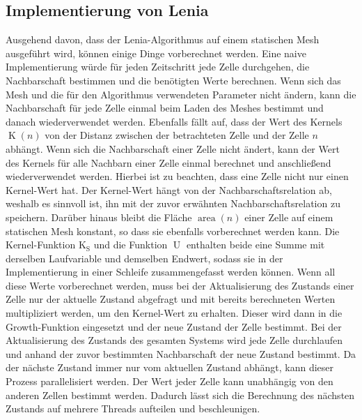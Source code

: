 \subsection{Implementierung von Lenia}
Ausgehend davon, dass der Lenia-Algorithmus auf einem statischen Mesh ausgeführt wird, können einige Dinge vorberechnet werden.
Eine naive Implementierung würde für jeden Zeitschritt jede Zelle durchgehen, die Nachbarschaft bestimmen und die benötigten Werte berechnen.
Wenn sich das Mesh und die für den Algorithmus verwendeten Parameter nicht ändern, kann die Nachbarschaft für jede Zelle einmal beim Laden des Meshes bestimmt und danach wiederverwendet werden.
Ebenfalls fällt auf, dass der Wert des Kernels $\operatorname{K}(n)$ von der Distanz zwischen der betrachteten Zelle und der Zelle $n$ abhängt.
Wenn sich die Nachbarschaft einer Zelle nicht ändert, kann der Wert des Kernels für alle Nachbarn einer Zelle einmal berechnet und anschließend wiederverwendet werden.
Hierbei ist zu beachten, dass eine Zelle nicht nur einen Kernel-Wert hat.
Der Kernel-Wert hängt von der Nachbarschaftsrelation ab, weshalb es sinnvoll ist, ihn mit der zuvor erwähnten Nachbarschaftsrelation zu speichern.
Darüber hinaus bleibt die Fläche $\operatorname{area}(n)$ einer Zelle auf einem statischen Mesh konstant, so dass sie ebenfalls vorberechnet werden kann.
Die Kernel-Funktion $\operatorname{K_S}$ und die Funktion $\operatorname{U}$ enthalten beide eine Summe mit derselben Laufvariable und demselben Endwert, sodass sie in der Implementierung in einer Schleife zusammengefasst werden können.
Wenn all diese Werte vorberechnet werden, muss bei der Aktualisierung des Zustands einer Zelle nur der aktuelle Zustand abgefragt und mit bereits berechneten Werten multipliziert werden, um den Kernel-Wert zu erhalten.
Dieser wird dann in die Growth-Funktion eingesetzt und der neue Zustand der Zelle bestimmt.
Bei der Aktualisierung des Zustands des gesamten Systems wird jede Zelle durchlaufen und anhand der zuvor bestimmten Nachbarschaft der neue Zustand bestimmt.
Da der nächste Zustand immer nur vom aktuellen Zustand abhängt, kann dieser Prozess parallelisiert werden.
Der Wert jeder Zelle kann unabhängig von den anderen Zellen bestimmt werden.
Dadurch lässt sich die Berechnung des nächsten Zustands auf mehrere Threads aufteilen und beschleunigen.